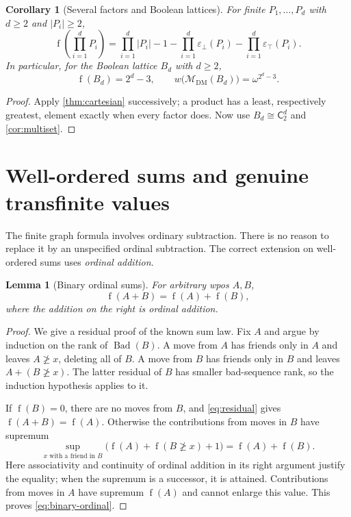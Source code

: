 \documentclass[11pt,letterpaper]{article}
\newtheorem{lemma}[lemma]{Lemma}
\newtheorem{corollary}[corollary]{Corollary}
\theoremstyle{definition}
\theoremstyle{remark}
\newcommand{\fot}{\operatorname{f}}
\newcommand{\Bad}{\operatorname{Bad}}
\newcommand{\DM}{\mathrm{DM}}
\newcommand{\M}{\mathcal M}
\newcommand{\C}{\mathsf C}
\newcommand{\epsbot}{\varepsilon_{\bot}}
\newcommand{\epstop}{\varepsilon_{\top}}
\begin{document}
\begin{corollary}[Several factors and Boolean lattices]\label{cor:boolean}
For finite $P_1,\ldots,P_d$ with $d\geq2$ and $|P_i|\geq2$,
\[
 \fot\left(\prod_{i=1}^dP_i\right)
 =\prod_{i=1}^d|P_i|-1
  -\prod_{i=1}^d\epsbot(P_i)-\prod_{i=1}^d\epstop(P_i).
\]
In particular, for the Boolean lattice $B_d$ with $d\geq2$,
\[
 \fot(B_d)=2^d-3,
 \qquad w\bigl(\M_{\DM}(B_d)\bigr)=\omega^{2^d-3}.
\]
\end{corollary}
\begin{proof}
Apply \cref{thm:cartesian} successively; a product has a least, respectively
greatest, element exactly when every factor does. Now use
$B_d\cong\C_2^d$ and \cref{cor:multiset}.
\end{proof}

\section{Well-ordered sums and genuine transfinite values}
\label{sec:transfinite}
The finite graph formula involves ordinary subtraction. There is no reason
to replace it by an unspecified ordinal subtraction. The correct extension
on well-ordered sums uses \emph{ordinal addition}.

\begin{lemma}[Binary ordinal sums]\label{lem:binary-ordinal}
For arbitrary wpos $A,B$,
\begin{equation}\label{eq:binary-ordinal}
 \fot(A+B)=\fot(A)+\fot(B),
\end{equation}
where the addition on the right is ordinal addition.
\end{lemma}
\begin{proof}
We give a residual proof of the known sum law. Fix $A$ and argue by induction
on the rank of $\Bad(B)$. A move from $A$ has friends only in $A$ and leaves
$A\not\geq x$, deleting all of $B$. A move from $B$ has friends only in
$B$ and leaves $A+(B\not\geq x)$. The latter residual of $B$ has smaller
bad-sequence rank, so the induction hypothesis applies to it.

If $\fot(B)=0$, there are no moves from $B$, and \eqref{eq:residual} gives
$\fot(A+B)=\fot(A)$. Otherwise the contributions from moves in $B$ have
supremum
\[
 \sup_{x\text{ with a friend in }B}
 \bigl(\fot(A)+\fot(B\not\geq x)+1\bigr)
 =\fot(A)+\fot(B).
\]
Here associativity and continuity of ordinal addition in its right argument
justify the equality; when the supremum is a successor, it is attained.
Contributions from moves in $A$ have supremum $\fot(A)$ and cannot enlarge
this value. This proves \eqref{eq:binary-ordinal}.
\end{proof}
\end{document}
